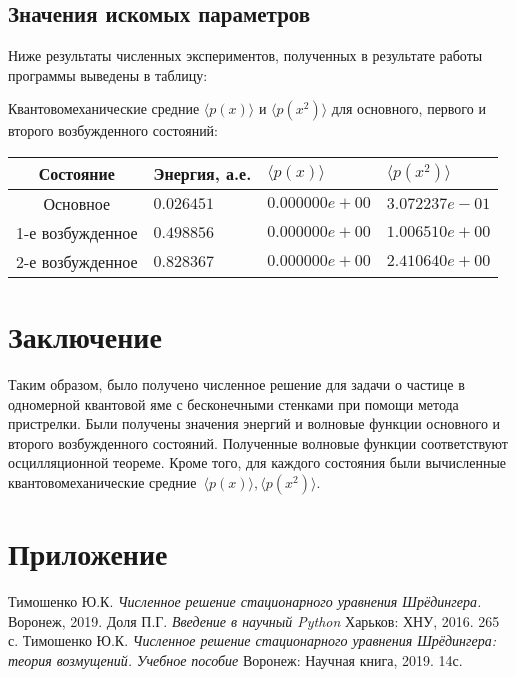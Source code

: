 \documentclass[a4paper,12pt]{article}
\begin{document}
\subsection{Значения искомых параметров}\label{subsec:results_values}

Ниже результаты численных экспериментов, полученных в результате работы программы выведены в таблицу:

Квантовомеханические средние $\langle p(x) \rangle$ и $\langle p(x^2) \rangle$ для основного, первого и второго возбужденного состояний:

\noindent
\begin{tabularx}{\linewidth}{|c|X|X|X|}
    \hline
    \textbf{Состояние}&\textbf{Энергия, а.е.}&\textbf{$\langle p(x) \rangle$}&\textbf{$\langle p(x^2) \rangle$} \\
    \hline
    Основное & $0.026451$ & $0.000000e+00$ & $3.072237e-01$\\
    \hline
    1-е возбужденное & $0.498856$ & $0.000000e+00$ & $1.006510e+00$\\
    \hline
    2-е возбужденное & $0.828367$ & $0.000000e+00$ & $2.410640e+00$\\
    \hline
\end{tabularx}

\newpage

\section{Заключение}\label{sec:zakl}

Таким образом, было получено численное решение для задачи о частице в одномерной квантовой яме с бесконечными стенками при помощи метода пристрелки.
Были получены значения энергий и волновые функции основного и второго возбужденного состояний.
Полученные волновые функции соответствуют осцилляционной теореме.
Кроме того, для каждого состояния были вычисленные квантовомеханические средние~$\langle p(x) \rangle, \langle p(x^2) \rangle$.

\newpage

\appendix

\section*{Приложение}\label{sec:extras}



\newpage
\begin{thebibliography}{9}
 Тимошенко Ю.К. \textit{Численное решение стационарного уравнения Шрёдингера.} Воронеж, 2019.
 Доля П.Г. \textit{Введение в научный Python} Харьков: ХНУ, 2016. 265 с.
 Тимошенко Ю.К. \textit{Численное решение стационарного уравнения Шрёдингера: теория возмущений. Учебное пособие} Воронеж: Научная книга, 2019. 14с.
\end{thebibliography}
\end{document}
